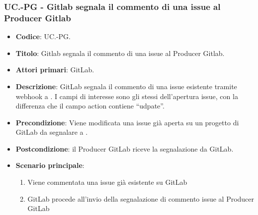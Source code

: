 \subsubsection{UC\theuccount.\thesubuccount-PG - Gitlab segnala il commento di una issue al Producer Gitlab}
\begin{itemize}
    \item \textbf{Codice}: UC\theuccount.\thesubuccount-PG.
    \item \textbf{Titolo}: Gitlab segnala il commento di una issue al Producer Gitlab.
    \item \textbf{Attori primari}: GitLab.
    \item \textbf{Descrizione}: GitLab segnala il commento di una issue esistente tramite webhook a \progetto.
    I campi di interesse sono gli stessi dell'apertura issue, con la differenza che il campo action contiene ``udpate''.
    \item \textbf{Precondizione}: Viene modificata una issue già aperta su un
    progetto di GitLab da segnalare a \progetto.
    \item \textbf{Postcondizione}: il Producer GitLab riceve la segnalazione da GitLab.
    \item \textbf{Scenario principale}: 
    \begin{enumerate}
        \item Viene commentata una issue già esistente su GitLab
        \item GitLab procede all'invio della segnalazione di commento issue al Producer GitLab
    \end{enumerate}
    
\end{itemize}


